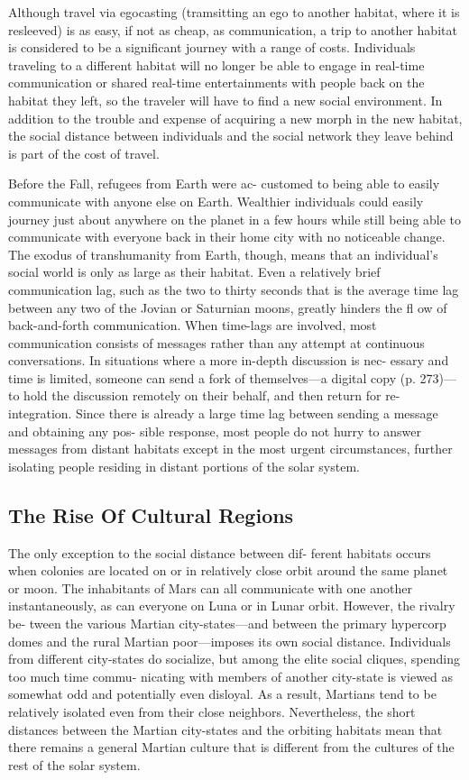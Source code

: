 Although travel via egocasting (tramsitting an ego 
to another habitat, where it is resleeved) is as easy, 
if not as cheap, as communication, a trip to another 
habitat is considered to be a significant journey with 
a range of costs. Individuals traveling to a different 
habitat will no longer be able to engage in real-time 
communication or shared real-time entertainments 
with people back on the habitat they left, so the 
traveler will have to find a new social environment. 
In addition to the trouble and expense of acquiring 
a new morph in the new habitat, the social distance 
between individuals and the social network they leave 
behind is part of the cost of travel.

Before the Fall, refugees from Earth were ac-
customed to being able to easily communicate with 
anyone else on Earth. Wealthier individuals could 
easily journey just about anywhere on the planet in a 
few hours while still being able to communicate with 
everyone back in their home city with no noticeable 
change. The exodus of transhumanity from Earth, 
though, means that an individual's social world is 
only as large as their habitat. Even a relatively brief 
communication lag, such as the two to thirty seconds 
that is the average time lag between any two of the 
Jovian or Saturnian moons, greatly hinders the fl ow of 
back-and-forth communication. When time-lags are 
involved, most communication consists of messages 
rather than any attempt at continuous conversations. 
In situations where a more in-depth discussion is nec-
essary and time is limited, someone can send a fork 
of themselves—a digital copy (p. 273)—to hold the 
discussion remotely on their behalf, and then return 
for re-integration. Since there is already a large time 
lag between sending a message and obtaining any pos-
sible response, most people do not hurry to answer 
messages from distant habitats except in the most 
urgent circumstances, further isolating people residing 
in distant portions of the solar system.

\subsection{The Rise Of Cultural Regions}

The only exception to the social distance between dif-
ferent habitats occurs when colonies are located on 
or in relatively close orbit around the same planet or 
moon. The inhabitants of Mars can all communicate 
with one another instantaneously, as can everyone 
on Luna or in Lunar orbit. However, the rivalry be-
tween the various Martian city-states—and between 
the primary hypercorp domes and the rural Martian 
poor—imposes its own social distance. Individuals 
from different city-states do socialize, but among the 
elite social cliques, spending too much time commu-
nicating with members of another city-state is viewed 
as somewhat odd and potentially even disloyal. As 
a result, Martians tend to be relatively isolated even 
from their close neighbors. Nevertheless, the short 
distances between the Martian city-states and the 
orbiting habitats mean that there remains a general 
Martian culture that is different from the cultures of 
the rest of the solar system.

